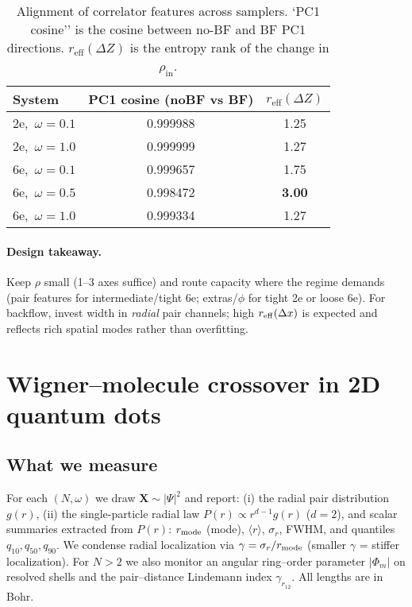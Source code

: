 \begin{table}[h] \centering \small \caption{Alignment of correlator features across samplers. `PC1 cosine'' is the cosine between no-BF and BF PC1 directions. $r_{\text{eff}}(\Delta Z)$ is the entropy rank of the change in $\rho_{\text{in}}$.} \label{tab:alignment} \begin{tabular}{lcc} \toprule System & PC1 cosine (noBF vs BF) & $r_{\text{eff}}(\Delta Z)$ \\ \midrule 2e,\ $\omega{=}0.1$ & 0.999988 & 1.25 \\ 2e,\ $\omega{=}1.0$ & 0.999999 & 1.27 \\ 6e,\ $\omega{=}0.1$ & 0.999657 & 1.75 \\ 6e,\ $\omega{=}0.5$ & 0.998472 & \textbf{3.00} \\ 6e,\ $\omega{=}1.0$ & 0.999334 & 1.27 \\ \bottomrule \end{tabular} \end{table}

\paragraph{Design takeaway.}
Keep $\rho$ small (1–3 axes suffice) and route capacity where the regime demands (pair features for intermediate/tight 6e;
extras/$\phi$ for tight 2e or loose 6e). For backflow, invest width in \emph{radial} pair channels; high $r_{\rm eff}(\Delta x)$
is expected and reflects rich spatial modes rather than overfitting.




\section{Wigner–molecule crossover in 2D quantum dots}
\label{sec:wigner-molecule}

\subsection{What we measure}
For each $(N,\omega)$ we draw $\mathbf X\!\sim |\Psi|^2$ and report:
(i) the radial pair distribution $g(r)$,
(ii) the single-particle radial law $P(r)\propto r^{d-1}g(r)$ ($d{=}2$),
and scalar summaries extracted from $P(r)$: $r_{\rm mode}$ (mode), $\langle r\rangle$, $\sigma_r$, FWHM, and quantiles $q_{10},q_{50},q_{90}$.
We condense radial localization via $\gamma=\sigma_r/r_{\rm mode}$ (smaller $\gamma$ = stiffer localization).
For $N>2$ we also monitor an angular ring–order parameter $|\Phi_m|$ on resolved shells and the pair–distance Lindemann index $\gamma_{r_{12}}$.
All lengths are in Bohr.

